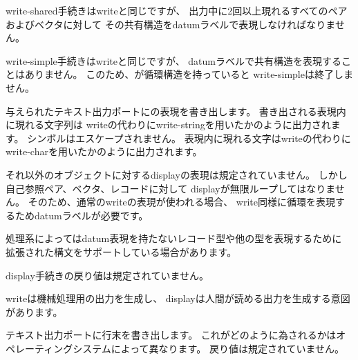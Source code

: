 \begin{entry}{%
}

{\cf write-shared}手続きは{\cf write}と同じですが、
出力中に2回以上現れるすべてのペアおよびベクタに対して
その共有構造をdatumラベルで表現しなければなりません。

\end{entry}

\begin{entry}{%
}

{\cf write-simple}手続きは{\cf write}と同じですが、
datumラベルで共有構造を表現することはありません。
このため、が循環構造を持っていると
{\cf write-simple}は終了しません。

\end{entry}


\begin{entry}{%
}

与えられたテキスト出力ポートにの表現を書き出します。
書き出される表現内に現れる文字列は
{\cf write}の代わりに{\cf write-string}を用いたかのように出力されます。
シンボルはエスケープされません。
表現内に現れる文字は{\cf write}の代わりに
{\cf write-char}を用いたかのように出力されます。

それ以外のオブジェクトに対する{\cf display}の表現は規定されていません。
しかし自己参照ペア、ベクタ、レコードに対して
{\cf display}が無限ループしてはなりません。
そのため、通常の{\cf write}の表現が使われる場合、
{\cf write}同様に循環を表現するためdatumラベルが必要です。

処理系によってはdatum表現を持たないレコード型や他の型を表現するために
拡張された構文をサポートしている場合があります。

{\cf display}手続きの戻り値は規定されていません。

\begin{rationale}
{\cf write}は機械処理用の出力を生成し、
{\cf display}は人間が読める出力を生成する意図があります。
\end{rationale}
\end{entry}


\begin{entry}{%
}

テキスト出力ポートに行末を書き出します。
これがどのように為されるかはオペレーティングシステムによって異なります。
戻り値は規定されていません。

\end{entry}


